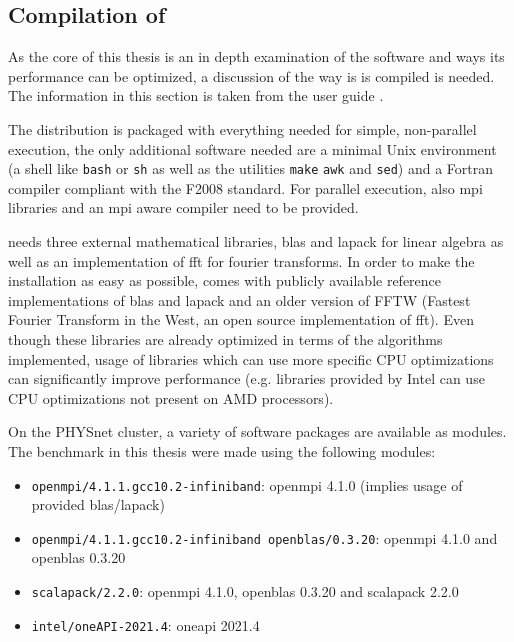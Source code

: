 \documentclass[main.tex]{subfiles}
\begin{document}
\subsection{Compilation of \QE}\label{sub:qe_compilation}

As the core of this thesis is an in depth examination of the \QE software and ways its performance can be optimized, a discussion of the way is is compiled is needed.
The information in this section is taken from the  user guide \cite{noauthor_quantum_nodate}.

The \QE distribution is packaged with everything needed for simple, non-parallel execution, the only additional software needed are a minimal Unix environment (a shell like \texttt{bash} or \texttt{sh} as well as the utilities \texttt{make} \texttt{awk} and \texttt{sed}) and a Fortran compiler compliant with the F2008 standard.
For parallel execution, also \gls{mpi} libraries and an \gls{mpi} aware compiler need to be provided.

\QE needs three external mathematical libraries, \gls{blas} and \gls{lapack} for linear algebra as well as an implementation of \gls{fft} for fourier transforms.
In order to make the installation as easy as possible, \QE comes with publicly available reference implementations  of \gls{blas} and \gls{lapack} and an older version of FFTW (Fastest Fourier Transform in the West, an open source implementation of \gls{fft}).
Even though these libraries are already optimized in terms of the algorithms implemented, usage of libraries which can use more specific CPU optimizations can significantly improve performance (e.g. libraries provided by Intel can use CPU optimizations not present on AMD processors).

On the PHYSnet cluster, a variety of software packages are available as modules.
The benchmark in this thesis were made using the following modules:
\begin{itemize}
    \item \texttt{openmpi/4.1.1.gcc10.2-infiniband}: \gls{openmpi} 4.1.0 (implies usage of \QE provided \gls{blas}/\gls{lapack})
    \item \texttt{openmpi/4.1.1.gcc10.2-infiniband openblas/0.3.20}: \gls{openmpi} 4.1.0 and \gls{openblas} 0.3.20
    \item \texttt{scalapack/2.2.0}: \gls{openmpi} 4.1.0, \gls{openblas} 0.3.20 and \gls{scalapack} 2.2.0
    \item \texttt{intel/oneAPI-2021.4}: \gls{oneapi} 2021.4
\end{itemize}
\end{document}
